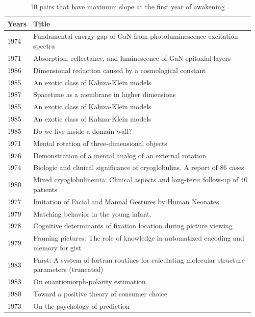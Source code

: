 \documentclass[utf8]{frontiersSCNS}
\newcommand\Tstrut{\rule{0pt}{2.9ex}} %
\begin{document}
\begin{table}[ht]
\caption{10 pairs that have maximum slope at the first year of awakening}%
\centering %
\begin{center}
\begin{tabular}{ll} 
\hline %
Years & Title \\
\hline 
\tiny{1974} & \tiny{Fundamental energy gap of GaN from photoluminescence excitation spectra} \Tstrut\\
\tiny{1971} &  \tiny{Absorption, reflectance, and luminescence of GaN epitaxial layers} \\
\hline
\tiny{1986} & \tiny{Dimensional reduction caused by a cosmological constant} \\
\tiny{1985} & \tiny{An exotic class of Kaluza-Klein models} \\
\hline
\tiny{1987} & \tiny{Spacetime as a membrane in higher dimensions} \\
\tiny{1985} & \tiny{An exotic class of Kaluza-Klein models} \\
\hline 
\tiny{1985} & \tiny{An exotic class of Kaluza-Klein models} \\
\tiny{1985} & \tiny{Do we live inside a domain wall?} \\
\hline
\tiny{1971} & \tiny{Mental rotation of three-dimensional objects} \\
\tiny{1976} & \tiny{Demonstration of a mental analog of an external rotation} \\
\hline
\tiny{1974} & \tiny{Biologic and clinical significance of cryoglobulins. A report of 86 cases} \\
\tiny{1980} & \tiny{Mixed cryoglobulinemia: Clinical aspects and long-term follow-up of 40 patients} \\
\hline
\tiny{1977} & \tiny{Imitation of Facial and Manual Gestures by Human Neonates} \\
\tiny{1979} & \tiny{Matching behavior in the young infant.} \\ 
\hline
\tiny{1978} & \tiny{Cognitive determinants of fixation location during picture viewing} \\
\tiny{1979} & \tiny{Framing pictures: The role of knowledge in automatized encoding and memory for gist} \\
\hline
\tiny{1983} & \tiny{Parst: A system of fortran routines for calculating molecular structure parameters (truncated)} \\
\tiny{1983} & \tiny{On enantiomorph‐polarity estimation} \\
\hline
\tiny{1980} & \tiny{Toward a positive theory of consumer choice} \\
\tiny{1973} & \tiny{On the psychology of prediction} \\
\hline 
\end{tabular}
\end{center}
\label{tab:table3} %
\end{table}
\end{document}
